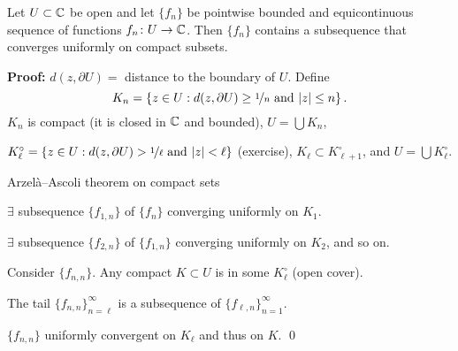 \documentclass[10pt,aspectratio=169]{beamer}
\begin{document}
\begin{frame}

\begin{corollary}
Let $U \subset {\mathbb{C}}$ be open and let $\{ f_n \}$
be pointwise bounded and equicontinuous sequence
of functions $f_n \colon U \to {\mathbb{C}}$.  Then
$\{ f_n \}$ contains a subsequence
that converges uniformly on compact subsets.
\end{corollary}

\pause
\textbf{Proof:}
$d(z,\partial U) = {}$ distance to the boundary of $U$.
\pause
Define
\begin{equation*}
K_n = \left\{
z \in U : d(z,\partial U) \geq \nicefrac{1}{n} \text{ and } \lvert {z} \rvert \leq n
\right\} .
\end{equation*}
\pause
$K_n$ is compact (it is closed in ${\mathbb{C}}$ and bounded),
\pause
\quad
$U = \bigcup K_n$,

\pause
$K^\circ_\ell = \left\{
z \in U : d(z,\partial U) > \nicefrac{1}{\ell} \text{ and } \lvert {z} \rvert < \ell
\right\}$ (exercise),
\quad
\pause
$K_\ell \subset K^\circ_{\ell+1}$,
\pause \quad and
$U = \bigcup K^\circ_\ell$.

\medskip
\pause

Arzel\`a--Ascoli theorem on compact sets \wthus

$\exists$ subsequence $\{ f_{1,n} \}$ of $\{f_n\}$ converging uniformly
on $K_1$.

\pause
$\exists$ subsequence $\{ f_{2,n} \}$ of $\{ f_{1,n} \}$ converging uniformly on $K_2$,
\pause
and so on.

\medskip
\pause
Consider $\{ f_{n,n} \}$. \pause Any compact $K \subset U$
is in some $K^\circ_\ell$ (open cover).

\pause
The tail $\{ f_{n,n} \}_{n=\ell}^\infty$ is a subsequence
of $\{ f_{\ell,n} \}_{n=1}^\infty$.

\pause
\thus \quad
$\{ f_{n,n} \}$
uniformly convergent on
$K_\ell$ and thus on $K$. \qed
\end{frame}
\end{document}
